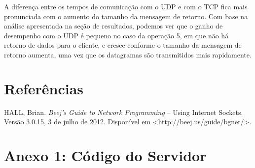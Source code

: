 \documentclass[11pt, brazil]{article} %
\begin{document}
A diferença entre os tempos de comunicação com o UDP e com o TCP fica mais pronunciada com o aumento do tamanho da mensagem de retorno. 
Com base na análise apresentada na seção de resultados, podemos ver que o ganho de desempenho com o UDP é pequeno no caso da operação 5, em que não há retorno de dados para o cliente, e cresce conforme o tamanho da mensagem de retorno aumenta, uma vez que os datagramas são transmitidos mais rapidamente.

\section{Referências}

HALL, Brian. \emph{Beej's Guide to Network Programming} -- Using Internet Sockets. Versão 3.0.15, 3 de julho de 2012. Disponível em <http://beej.us/guide/bgnet/>.

\section*{Anexo 1: Código do Servidor}
\end{document}
